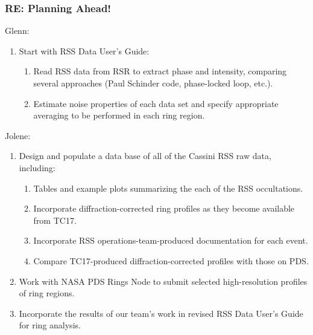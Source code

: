 \documentclass[crop=false,class=article,oneside]{standalone}
\begin{document}
        \subsubsection{RE: Planning Ahead!}
            Glenn:
            \begin{enumerate}
                \item Start with RSS Data User's Guide:
                \begin{enumerate}
                    \item Read RSS data from RSR to extract phase and
                          intensity, comparing several approaches
                          (Paul Schinder code, phase-locked loop, etc.).
                    \item Estimate noise properties of each data set
                          and specify appropriate averaging to be
                          performed in each ring region.
                \end{enumerate}
            \end{enumerate}
            Jolene:
            \begin{enumerate}
                \item Design and populate a data base of all of
                      the Cassini RSS raw data, including:
                    \begin{enumerate}
                        \item Tables and example plots summarizing
                              the each of the RSS occultations.
                        \item Incorporate diffraction-corrected ring
                              profiles as they become available from TC17.
                        \item Incorporate RSS operations-team-produced
                              documentation for each event.
                        \item Compare TC17-produced diffraction-corrected
                              profiles with those on PDS.
                    \end{enumerate}
                \item Work with NASA PDS Rings Node to submit selected
                      high-resolution profiles of ring regions.
                \item Incorporate the results of our team's work in
                      revised RSS Data User's Guide for ring analysis.
            \end{enumerate}
\end{document}
